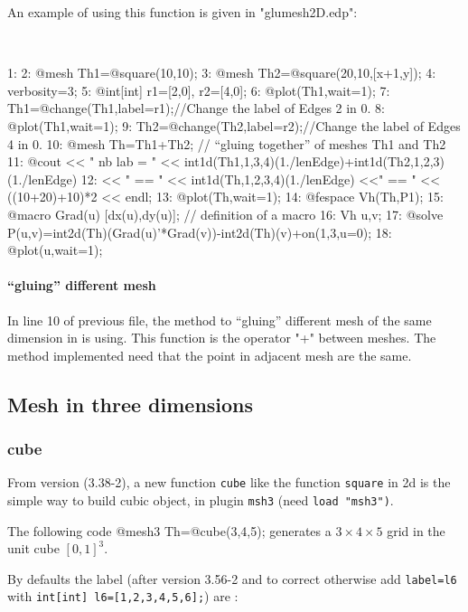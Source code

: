 \documentclass[a4paper,twoside,12pt]{book}
\begin{document}
An example of using this function is given in "glumesh2D.edp":  
\begin{example}
\label{changelabel}~
\bFF

 1:
 2: @mesh Th1=@square(10,10);
 3: @mesh Th2=@square(20,10,[x+1,y]);
 4: verbosity=3;
 5: @int[int] r1=[2,0],  r2=[4,0];
 6: @plot(Th1,wait=1);
 7: Th1=@change(Th1,label=r1);//Change the label of Edges  2 in 0.
 8: @plot(Th1,wait=1);
 9: Th2=@change(Th2,label=r2);//Change the label of Edges  4 in 0.
10: @mesh Th=Th1+Th2;         //  ``gluing together'' of meshes Th1 and Th2
11: @cout << " nb lab = " << int1d(Th1,1,3,4)(1./lenEdge)+int1d(Th2,1,2,3)(1./lenEdge)
12:          << " == " << int1d(Th,1,2,3,4)(1./lenEdge) <<" == " << ((10+20)+10)*2 << endl;
13: @plot(Th,wait=1);
14: @fespace Vh(Th,P1);
15: @macro Grad(u) [dx(u),dy(u)]; // definition of a macro
16: Vh u,v;
17: @solve P(u,v)=int2d(Th)(Grad(u)'*Grad(v))-int2d(Th)(v)+on(1,3,u=0);
18: @plot(u,wait=1);

\eFF
\end{example}

\paragraph{``gluing'' different mesh}
In line 10 of previous file, the method to ``gluing'' different mesh of the same dimension in \freefempp is using.
This function is the operator "+" between meshes. 
The method implemented need that the point in adjacent mesh are the same.


\subsection{Mesh in three dimensions}
\subsubsection{cube}
From version (3.38-2), a new function \texttt{cube} like the function \texttt{square} in 2d is the simple way to build cubic object, in plugin \texttt{msh3} (need \texttt{load "msh3")}.

The following code
\bFF
@mesh3 Th=@cube(3,4,5); 
\eFF
generates a $3\times 4 \times 5$ grid in the unit cube $[0, 1]^3$.

By defaults the label (after version 3.56-2 and to correct otherwise add \texttt{label=l6} with \texttt{int[int] l6=[1,2,3,4,5,6];}) are : 
\end{document}
